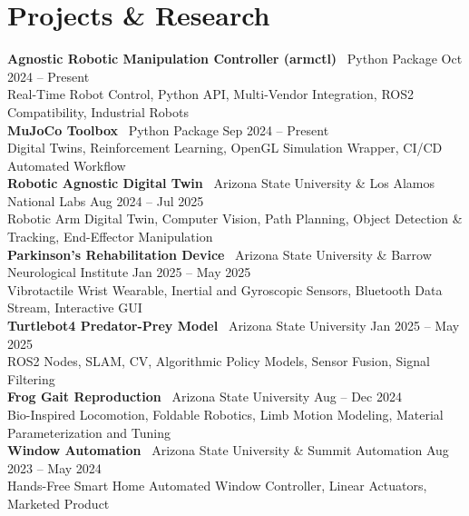 \documentclass[10pt]{article}
\begin{document}
\section*{Projects \& Research}
\textbf{Agnostic Robotic Manipulation Controller (armctl)} \textbar\ Python Package \hfill Oct 2024 -- Present \\
\hspace*{2em}Real-Time Robot Control, Python API, Multi-Vendor Integration, ROS2 Compatibility, Industrial Robots
\\
\textbf{MuJoCo Toolbox} \textbar\ Python Package \hfill Sep 2024 -- Present \\
\hspace*{2em}Digital Twins, Reinforcement Learning, OpenGL Simulation Wrapper, CI/CD Automated Workflow
\\
\textbf{Robotic Agnostic Digital Twin} \textbar\ Arizona State University \& Los Alamos National Labs  \hfill Aug 2024 -- Jul 2025 \\
\hspace*{2em}Robotic Arm Digital Twin, Computer Vision, Path Planning, Object Detection \& Tracking, End-Effector Manipulation
\\
\textbf{Parkinson's Rehabilitation Device} \textbar\ Arizona State University \& Barrow Neurological Institute \hfill Jan 2025 -- May 2025 \\
\hspace*{2em}Vibrotactile Wrist Wearable, Inertial and Gyroscopic Sensors, Bluetooth Data Stream, Interactive GUI
\\
\textbf{Turtlebot4 Predator-Prey Model} \textbar\ Arizona State University \hfill Jan 2025 -- May 2025 \\
\hspace*{2em}ROS2 Nodes, SLAM, CV, Algorithmic Policy Models, Sensor Fusion, Signal Filtering
\\
\textbf{Frog Gait Reproduction} \textbar\ Arizona State University \hfill Aug -- Dec 2024 \\
\hspace*{2em}Bio-Inspired Locomotion, Foldable Robotics, Limb Motion Modeling, Material Parameterization and Tuning
\\
\textbf{Window Automation} \textbar\ Arizona State University \& Summit Automation \hfill Aug 2023 -- May 2024 \\
\hspace*{2em}Hands-Free Smart Home Automated Window Controller, Linear Actuators, Marketed Product
\\
\end{document}
